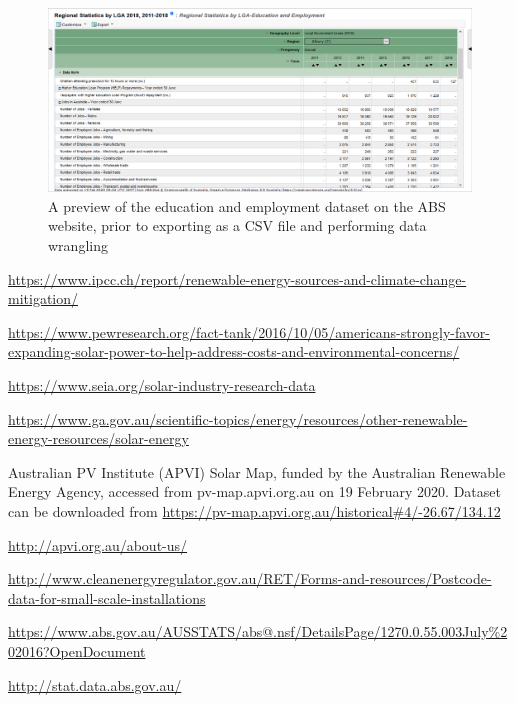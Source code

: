 \documentclass{article}
\begin{document}
\begin{figure}
  \includegraphics[width=\linewidth]{fig2.png}
  \caption{A preview of the education and employment dataset on the ABS website, prior to exporting as a CSV file and performing data wrangling}
  \label{fig:fig2}
\end{figure}

\medskip

\begin{thebibliography}{9}

\url{https://www.ipcc.ch/report/renewable-energy-sources-and-climate-change-mitigation/}

\url{https://www.pewresearch.org/fact-tank/2016/10/05/americans-strongly-favor-expanding-solar-power-to-help-address-costs-and-environmental-concerns/}

\url{https://www.seia.org/solar-industry-research-data}

\url{https://www.ga.gov.au/scientific-topics/energy/resources/other-renewable-energy-resources/solar-energy}

Australian PV Institute (APVI) Solar Map, funded by the Australian Renewable Energy Agency, accessed from pv-map.apvi.org.au on 19 February 2020. Dataset can be downloaded from \url{https://pv-map.apvi.org.au/historical#4/-26.67/134.12}

\url{http://apvi.org.au/about-us/}

\url{http://www.cleanenergyregulator.gov.au/RET/Forms-and-resources/Postcode-data-for-small-scale-installations}

\url{https://www.abs.gov.au/AUSSTATS/abs@.nsf/DetailsPage/1270.0.55.003July%202016?OpenDocument}

\url{http://stat.data.abs.gov.au/}

\end{thebibliography}
\end{document}

